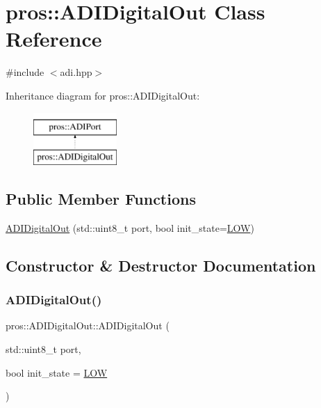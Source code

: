 \hypertarget{classpros_1_1ADIDigitalOut}{}\section{pros\+:\+:A\+D\+I\+Digital\+Out Class Reference}
\label{classpros_1_1ADIDigitalOut}


{\ttfamily \#include $<$adi.\+hpp$>$}

Inheritance diagram for pros\+:\+:A\+D\+I\+Digital\+Out\+:\begin{figure}[H]
\begin{center}
\leavevmode
\includegraphics[height=2.000000cm]{classpros_1_1ADIDigitalOut}
\end{center}
\end{figure}
\subsection*{Public Member Functions}
\begin{DoxyCompactItemize}
\item 
\hyperlink{classpros_1_1ADIDigitalOut_a1c5dbea7f767418550df8007cfb0d221}{A\+D\+I\+Digital\+Out} (std\+::uint8\+\_\+t port, bool init\+\_\+state=\hyperlink{adi_8h_ab811d8c6ff3a505312d3276590444289}{L\+OW})
\end{DoxyCompactItemize}


\subsection{Constructor \& Destructor Documentation}
\mbox{\label{classpros_1_1ADIDigitalOut_a1c5dbea7f767418550df8007cfb0d221}} 
\subsubsection{\texorpdfstring{A\+D\+I\+Digital\+Out()}{ADIDigitalOut()}}
{\footnotesize\ttfamily pros\+::\+A\+D\+I\+Digital\+Out\+::\+A\+D\+I\+Digital\+Out (\begin{DoxyParamCaption}\item[{std\+::uint8\+\_\+t}]{port,  }\item[{bool}]{init\+\_\+state = {\ttfamily \hyperlink{adi_8h_ab811d8c6ff3a505312d3276590444289}{L\+OW}} }\end{DoxyParamCaption})}

